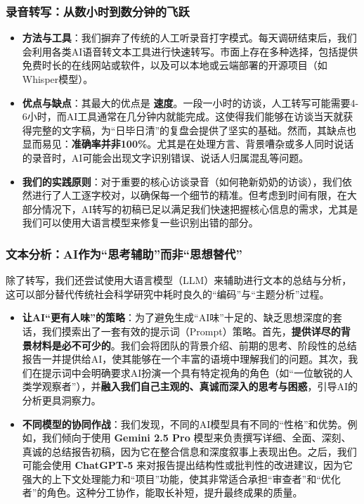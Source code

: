 \documentclass[UTF8]{ctexart}
\begin{document}
\subsubsection{录音转写：从数小时到数分钟的飞跃}
\begin{itemize}
    \item \textbf{方法与工具}：我们摒弃了传统的人工听录音打字模式。每天调研结束后，我们会利用各类AI语音转文本工具进行快速转写。市面上存在多种选择，包括提供免费时长的在线网站或软件，以及可以本地或云端部署的开源项目（如Whisper模型）。
    \item \textbf{优点与缺点}：其最大的优点是 \textbf{速度}。一段一小时的访谈，人工转写可能需要4-6小时，而AI工具通常在几分钟内就能完成。这使得我们能够在访谈当天就获得完整的文字稿，为“日毕日清”的复盘会提供了坚实的基础。然而，其缺点也显而易见：\textbf{准确率并非100\%}。尤其是在处理方言、背景嘈杂或多人同时说话的录音时，AI可能会出现文字识别错误、说话人归属混乱等问题。
    \item \textbf{我们的实践原则}：对于重要的核心访谈录音（如何艳新奶奶的访谈），我们依然进行了人工逐字校对，以确保每一个细节的精准。但考虑到时间有限，在大部分情况下，AI转写的初稿已足以满足我们快速把握核心信息的需求，尤其是我们可以使用大语言模型来修复一些识别出错的部分。
\end{itemize}

\subsubsection{文本分析：AI作为“思考辅助”而非“思想替代”}
除了转写，我们还尝试使用大语言模型（LLM）来辅助进行文本的总结与分析，这可以部分替代传统社会科学研究中耗时良久的“编码”与“主题分析”过程。

\begin{itemize}
    \item \textbf{让AI“更有人味”的策略}：为了避免生成“AI味”十足的、缺乏思想深度的套话，我们摸索出了一套有效的提示词（Prompt）策略。首先，\textbf{提供详尽的背景材料是必不可少的}。我们会将团队的背景介绍、前期的思考、阶段性的总结报告一并提供给AI，使其能够在一个丰富的语境中理解我们的问题。其次，我们在提示词中会明确要求AI扮演一个具有特定视角的角色（如“一位敏锐的人类学观察者”），并\textbf{融入我们自己主观的、真诚而深入的思考与困惑}，引导AI的分析更具洞察力。
    
    \item \textbf{不同模型的协同作战}：我们发现，不同的AI模型具有不同的“性格”和优势。例如，我们倾向于使用 \textbf{Gemini 2.5 Pro} 模型来负责撰写详细、全面、深刻、真诚的总结报告初稿，因为它在整合信息和深度叙事上表现出色。之后，我们可能会使用 \textbf{ChatGPT-5} 来对报告提出结构性或批判性的改进建议，因为它强大的上下文处理能力和“项目”功能，使其非常适合承担“审查者”和“优化者”的角色。这种分工协作，能取长补短，提升最终成果的质量。
\end{itemize}
\end{document}
